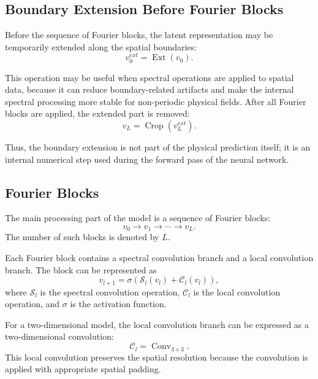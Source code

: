 \subsection{Boundary Extension Before Fourier Blocks}

Before the sequence of Fourier blocks, the latent representation may be temporarily extended along the spatial boundaries:
\begin{equation}
v_0^{ext}
=
\operatorname{Ext}(v_0).
\end{equation}

This operation may be useful when spectral operations are applied to spatial data, because it can reduce boundary-related artifacts and make the internal spectral processing more stable for non-periodic physical fields. After all Fourier blocks are applied, the extended part is removed:
\begin{equation}
v_L
=
\operatorname{Crop}(v_L^{ext}).
\end{equation}

Thus, the boundary extension is not part of the physical prediction itself; it is an internal numerical step used during the forward pass of the neural network.

\subsection{Fourier Blocks}

The main processing part of the model is a sequence of Fourier blocks:
\begin{equation}
v_0
\rightarrow
v_1
\rightarrow
\cdots
\rightarrow
v_L.
\end{equation}
The number of such blocks is denoted by \(L\).

Each Fourier block contains a spectral convolution branch and a local convolution branch. The block can be represented as
\begin{equation}
v_{l+1}
=
\sigma
\left(
\mathcal{S}_l(v_l)
+
\mathcal{C}_l(v_l)
\right),
\end{equation}
where \(\mathcal{S}_l\) is the spectral convolution operation, \(\mathcal{C}_l\) is the local convolution operation, and \(\sigma\) is the activation function.

For a two-dimensional model, the local convolution branch can be expressed as a two-dimensional convolution:
\begin{equation}
\mathcal{C}_l
=
\operatorname{Conv}_{3 \times 3}.
\end{equation}
This local convolution preserves the spatial resolution because the convolution is applied with appropriate spatial padding.

